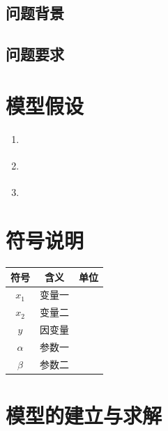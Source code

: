\documentclass[12pt,a4paper]{article}
\begin{document}
\subsection{问题背景}


\subsection{问题要求}


\section{模型假设}

\begin{enumerate}
  \item \underline{\hspace{10cm}}
  \item \underline{\hspace{10cm}}
  \item \underline{\hspace{10cm}}
\end{enumerate}

\vspace{0.3cm}

\section{符号说明}

\begin{center}
\begin{tabular}{ccc}
  \toprule
  \textbf{符号} & \textbf{含义} & \textbf{单位} \\
  \midrule
  $x_1$ & 变量一 &   \\
  $x_2$ & 变量二 &   \\
  $y$   & 因变量 &   \\
  $\alpha$ & 参数一 &   \\
  $\beta$  & 参数二 &   \\
  \bottomrule
\end{tabular}
\end{center}

\section{模型的建立与求解}
\end{document}
